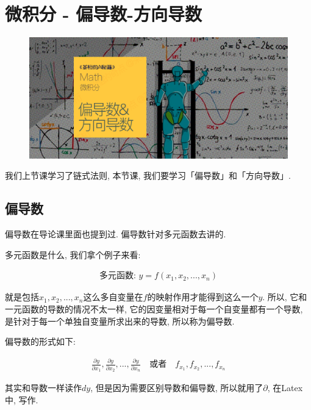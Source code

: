 \chapter{微积分 - 偏导数-方向导数}

\begin{figure}[ht]
  \centering
  \includegraphics[width=1\textwidth]{asset/茶桁的AI秘籍_Math_11.png}
\end{figure}

\newpage

我们上节课学习了链式法则, 本节课, 我们要学习「偏导数」和「方向导数」. 

\section{偏导数}

偏导数在导论课里面也提到过. 偏导数针对多元函数去讲的. 

多元函数是什么, 我们拿个例子来看: 

\begin{align*}
  \mbox{多元函数: }y = f(x_1, x_2, ..., x_n)
\end{align*}

就是包括$x_1,  x_2,  ...,  x_n$这么多自变量在$f$的映射作用才能得到这么一个$y$. 所以, 它和一元函数的导数的情况不太一样, 它的因变量相对于每一个自变量都有一个导数, 是针对于每一个单独自变量所求出来的导数, 所以称为偏导数. 

偏导数的形式如下: 

\begin{align*}
  \frac{\partial y}{\partial x_1},  \frac{\partial y}{\partial x_2},  ...,  \frac{\partial y}{\partial x_n} \quad \mbox{或者} \quad f_{x_1},  f_{x_2},  ...,  f_{x_n}
\end{align*}

其实和导数一样读作\(dy\),  但是因为需要区别导数和偏导数, 所以就用了\(\partial\), 在Latex中, 写作\pyth{\partial}.

